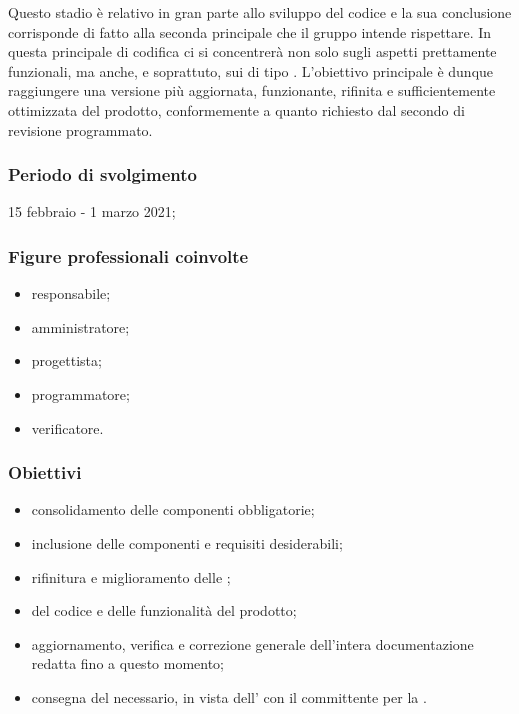 Questo stadio è relativo in gran parte allo sviluppo del codice e la sua conclusione corrisponde di fatto alla seconda  principale che il gruppo \Gruppo{} intende rispettare. In questa  principale di codifica ci si concentrerà non solo sugli aspetti prettamente funzionali, ma anche, e soprattuto, sui  di tipo . L'obiettivo principale è dunque raggiungere una versione più aggiornata, funzionante, rifinita e sufficientemente ottimizzata del prodotto, conformemente a quanto richiesto dal secondo  di revisione programmato.
        
        \subsubsection{Periodo di svolgimento}
        15 febbraio - 1 marzo 2021;
        
        \subsubsection{Figure professionali coinvolte}
            \begin{itemize}
                \item responsabile;
                \item amministratore;
                \item progettista;
                \item programmatore;
                \item verificatore.
            \end{itemize}

        \subsubsection{Obiettivi}
        \begin{itemize}
            \item consolidamento delle componenti obbligatorie;
            \item inclusione delle componenti e requisiti desiderabili;
            \item rifinitura e miglioramento delle ;
            \item {} del codice e delle funzionalità del prodotto;
            \item aggiornamento, verifica e correzione generale dell'intera documentazione redatta fino a questo momento;
            \item consegna del  necessario, in vista dell' con il committente per la \RP{}.
        \end{itemize}